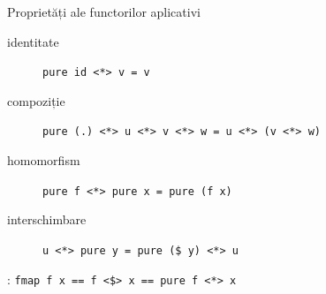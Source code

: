 \documentclass[xcolor=pdftex,romanian,colorlinks]{beamer}
\begin{document}
\begin{frame}{Proprietăți ale functorilor aplicativi}
\begin{description}
\item[identitate] \lstinline"pure id <*> v = v"
\item[compoziție] \lstinline"pure (.) <*> u <*> v <*> w = u <*> (v <*> w)"
\item[homomorfism] \lstinline"pure f <*> pure x = pure (f x)"
\item[interschimbare] \lstinline"u <*> pure y = pure ($ y) <*> u"
\end{description}

: \lstinline"fmap f x == f <$> x == pure f <*> x"
\end{frame}

%
%
\end{document}
